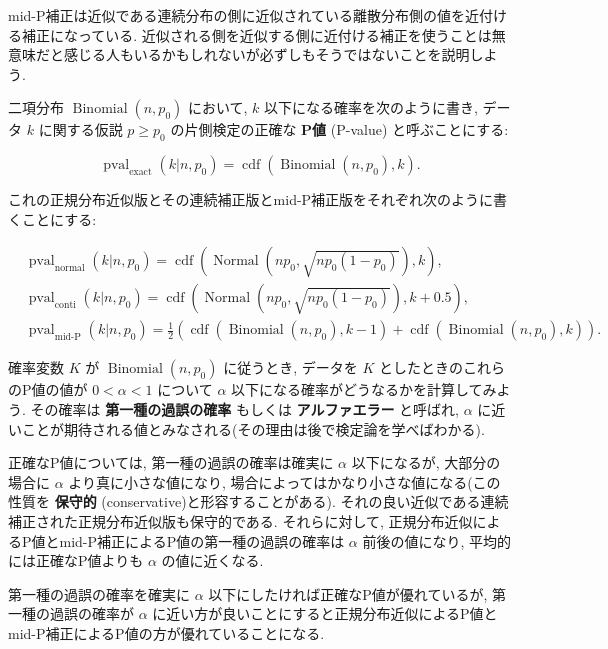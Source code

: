\documentclass[
  letterpaper,
  DIV=11,
  numbers=noendperiod]{scrartcl}
\begin{document}
mid-P補正は近似である連続分布の側に近似されている離散分布側の値を近付ける補正になっている.
近似される側を近似する側に近付ける補正を使うことは無意味だと感じる人もいるかもしれないが必ずしもそうではないことを説明しよう.

二項分布 \(\operatorname{Binomial}(n, p_0)\) において, \(k\)
以下になる確率を次のように書き, データ \(k\) に関する仮説 \(p\ge p_0\)
の片側検定の正確な \textbf{P値} (P-value) と呼ぶことにする:

\[
\operatorname{pval}_{\operatorname{exact}}(k|n,p_0) = \operatorname{cdf}(\operatorname{Binomial}(n, p_0), k).
\]

これの正規分布近似版とその連続補正版とmid-P補正版をそれぞれ次のように書くことにする:

\[
\begin{aligned}
&
\operatorname{pval}_{\operatorname{normal}}(k|n,p_0) =
\operatorname{cdf}(\operatorname{Normal}(n p_0, \sqrt{n p_0(1 - p_0)}), k),
\\ &
\operatorname{pval}_{\operatorname{conti}}(k|n,p_0) =
\operatorname{cdf}(\operatorname{Normal}(n p_0, \sqrt{n p_0(1 - p_0)}), k+0.5),
\\ &
\operatorname{pval}_{\operatorname{mid-P}}(k|n,p_0) =
\frac{1}{2}(\operatorname{cdf}(\operatorname{Binomial}(n, p_0), k-1) + \operatorname{cdf}(\operatorname{Binomial}(n, p_0), k)).
\end{aligned}
\]

確率変数 \(K\) が \(\operatorname{Binomial}(n, p_0)\) に従うとき,
データを \(K\) としたときのこれらのP値の値が \(0<\alpha<1\) について
\(\alpha\) 以下になる確率がどうなるかを計算してみよう. その確率は
\textbf{第一種の過誤の確率} もしくは \textbf{アルファエラー} と呼ばれ,
\(\alpha\)
に近いことが期待される値とみなされる(その理由は後で検定論を学べばわかる).

正確なP値については, 第一種の過誤の確率は確実に \(\alpha\) 以下になるが,
大部分の場合に \(\alpha\) より真に小さな値になり,
場合によってはかなり小さな値になる(この性質を \textbf{保守的}
(conservative)と形容することがある).
それの良い近似である連続補正された正規分布近似版も保守的である.
それらに対して,
正規分布近似によるP値とmid-P補正によるP値の第一種の過誤の確率は
\(\alpha\) 前後の値になり, 平均的には正確なP値よりも \(\alpha\)
の値に近くなる.

第一種の過誤の確率を確実に \(\alpha\)
以下にしたければ正確なP値が優れているが, 第一種の過誤の確率が \(\alpha\)
に近い方が良いことにすると正規分布近似によるP値とmid-P補正によるP値の方が優れていることになる.
\end{document}
